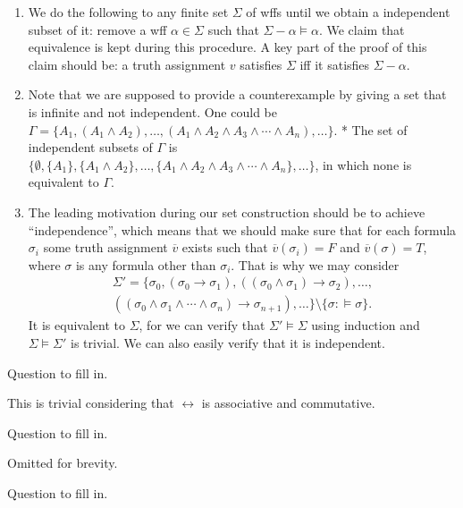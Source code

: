 \begin{enumerate}[label=(\alph*)]
  \item
        We do the following to any finite set $\Sigma$ of wffs until we obtain a independent subset of it: remove a wff $\alpha\in \Sigma$ such that $\Sigma-\alpha\vDash \alpha$. We claim that equivalence is kept during this procedure. A key part of the proof of this claim should be: a truth assignment $v$ satisfies $\Sigma$ iff it satisfies $\Sigma-\alpha$.
  \item
        Note that we are supposed to provide a counterexample by giving a set that is infinite and not independent. One could be $\Gamma=\{A_1, (A_1\wedge A_2), \dots, (A_1\wedge A_2\wedge A_3\wedge\cdots\wedge A_n),\dots\}$. * The set of independent subsets of $\Gamma$ is $\{\emptyset, \{A_1\}, \{A_1\wedge A_2\},\dots, \{A_1\wedge A_2\wedge A_3\wedge\cdots\wedge A_n\},\dots\}$, in which none is equivalent to $\Gamma$.
  \item
        The leading motivation during our set construction should be to achieve ``independence'', which means that we should make sure that for each formula $\sigma_i$ some truth assignment $\overline{v}$ exists such that $\overline{v}(\sigma_i)=F$ and $\overline{v}(\sigma)=T$, where $\sigma$ is any formula other than $\sigma_i$. That is why we may consider
        \begin{align*}
          \Sigma'=\{\sigma_0,(\sigma_0\rightarrow \sigma_1), ((\sigma_0\wedge \sigma_1)\rightarrow \sigma_2),\dots, \\((\sigma_0\wedge \sigma_1\wedge\cdots\wedge \sigma_n)\rightarrow \sigma_{n+1}),\dots\}\setminus\{\sigma:\vDash \sigma\}.
        \end{align*}
        It is equivalent to $\Sigma$, for we can verify that $\Sigma'\vDash \Sigma$ using induction and $\Sigma\vDash \Sigma'$ is trivial. We can also easily verify that it is independent.
\end{enumerate}

\begin{exercise}
  Question to fill in.
\end{exercise}

This is trivial considering that $\leftrightarrow$ is associative and commutative.

\begin{exercise}
  Question to fill in.
\end{exercise}

Omitted for brevity.

\begin{exercise}
  Question to fill in.
\end{exercise}

